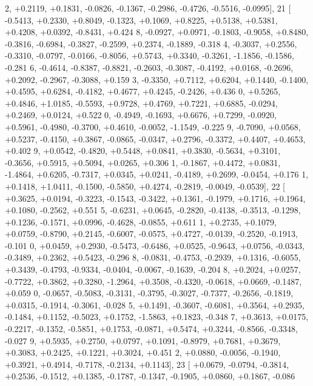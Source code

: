 \begin{DoxyCode}
      2, +0.2119, +0.1831, -0.0826, -0.1367, -0.2986, -0.4726, -0.5516, -0.0995],
21 [ -0.5413, +0.2330, +0.8049, -0.1323, +0.1069, +0.8225, +0.5138, +0.5381, +0.4208, +0.0392, -0.8431, +0.424
      8, -0.0927, +0.0971, -0.1803, -0.9058, +0.8480, -0.3816, -0.6984, -0.3827, -0.2599, +0.2374, -0.1889, -0.318
      4, -0.3037, +0.2556, -0.3310, -0.0797, -0.0166, -0.8056, +0.5743, +0.3340, -0.3261, -1.1856, -0.1586, -0.281
      6, -0.4614, -0.8387, -0.8821, -0.2603, -0.3087, -0.4192, +0.0168, -0.2696, +0.2092, -0.2967, -0.3088, +0.159
      3, -0.3350, +0.7112, +0.6204, +0.1440, -0.1400, +0.4595, +0.6284, -0.4182, +0.4677, +0.4245, -0.2426, +0.436
      0, +0.5265, +0.4846, +1.0185, -0.5593, +0.9728, +0.4769, +0.7221, +0.6885, -0.0294, +0.2469, +0.0124, +0.522
      0, -0.4949, -0.1693, +0.6676, +0.7299, -0.0920, +0.5961, -0.4980, -0.3700, +0.4610, -0.0052, -1.1549, -0.225
      9, -0.7090, +0.0568, +0.5237, -0.4150, +0.3867, -0.0865, -0.0347, +0.2796, -0.3372, +0.4407, +0.4653, +0.402
      9, +0.0542, -0.4820, +0.5448, +0.0841, +0.3830, -0.5634, +0.3101, -0.3656, +0.5915, +0.5094, +0.0265, +0.306
      1, -0.1867, +0.4472, +0.0831, -1.4864, +0.6205, -0.7317, +0.0345, +0.0241, -0.4189, +0.2699, -0.0454, +0.176
      1, +0.1418, +1.0411, -0.1500, -0.5850, +0.4274, -0.2819, -0.0049, -0.0539],
22 [ +0.3625, +0.0194, -0.3223, -0.1543, -0.3422, +0.1361, -0.1979, +0.1716, +0.1964, +0.1080, -0.2562, +0.551
      5, -0.6231, +0.0645, -0.2820, -0.4138, -0.3513, -0.1298, +0.1236, -0.1571, +0.0996, -0.4628, -0.0855, +0.611
      1, +0.2735, +0.1079, +0.0759, -0.8790, +0.2145, -0.6007, -0.0575, +0.4727, -0.0139, -0.2520, -0.1913, -0.101
      0, +0.0459, +0.2930, -0.5473, -0.6486, +0.0525, -0.9643, +0.0756, -0.0343, -0.3489, +0.2362, +0.5423, -0.296
      8, -0.0831, -0.4753, -0.2939, +0.1316, -0.6055, +0.3439, -0.4793, -0.9334, -0.0404, -0.0067, -0.1639, -0.204
      8, +0.2024, +0.0257, -0.7722, +0.3862, +0.3280, -1.2964, +0.3508, -0.4320, -0.0618, +0.0669, -0.1487, +0.059
      0, -0.0657, -0.5083, -0.3131, -0.3795, -0.3027, -0.7377, -0.2656, -0.1819, +0.0315, -0.1914, -0.3061, -0.028
      5, +0.1491, -0.3607, -0.6081, +0.3564, +0.2935, -0.1484, +0.1152, -0.5023, +0.1752, -1.5863, +0.1823, -0.348
      7, +0.3613, +0.0175, -0.2217, -0.1352, -0.5851, +0.1753, -0.0871, +0.5474, +0.3244, -0.8566, -0.3348, -0.027
      9, +0.5935, +0.2750, +0.0797, +0.1091, -0.8979, +0.7681, +0.3679, +0.3083, +0.2425, +0.1221, +0.3024, +0.451
      2, +0.0880, -0.0056, -0.1940, +0.3921, +0.4914, -0.7178, -0.2134, +0.1143],
23 [ +0.0679, -0.0794, -0.3814, +0.2536, -0.1512, +0.1385, -0.1787, -0.1347, -0.1905, +0.0860, +0.1867, -0.086

\end{DoxyCode}
